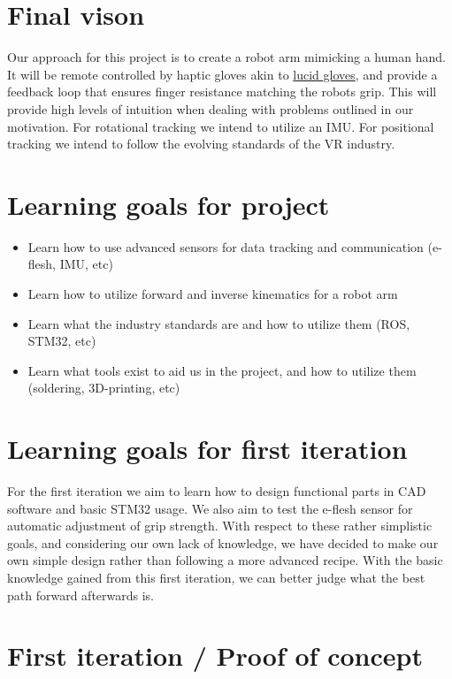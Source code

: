 \documentclass[a4paper,12pt]{article}
\begin{document}
\section{Final vison}
Our approach for this project is to create a robot arm mimicking a human hand. It will be remote controlled
by haptic gloves akin to \href{https://github.com/LucidVR/lucidgloves}{lucid gloves}, and provide a feedback
loop that ensures finger resistance matching the robots grip.
This will provide high levels of intuition when dealing with problems outlined in our motivation.
For rotational tracking we intend to utilize an IMU. For positional tracking we intend to follow the evolving
standards of the VR industry.

\section{Learning goals for project}
\begin{itemize}
  \item Learn how to use advanced sensors for data tracking and communication (e-flesh, IMU, etc)
  \item Learn how to utilize forward and inverse kinematics for a robot arm
  \item Learn what the industry standards are and how to utilize them (ROS, STM32, etc)
  \item Learn what tools exist to aid us in the project, and how to utilize them (soldering, 3D-printing, etc)
\end{itemize}

\section{Learning goals for first iteration}

For the first iteration we aim to learn how to design functional parts in CAD software
and basic STM32 usage. We also aim to test the e-flesh sensor \cite{pattabiraman2025eflesh} for automatic
adjustment of grip strength. With respect to these rather simplistic goals, and considering
our own lack of knowledge, we have decided to make our own simple design rather than following
a more advanced recipe. With the basic knowledge gained from this first iteration, we can
better judge what the best path forward afterwards is.

\section{First iteration / Proof of concept}
\end{document}
